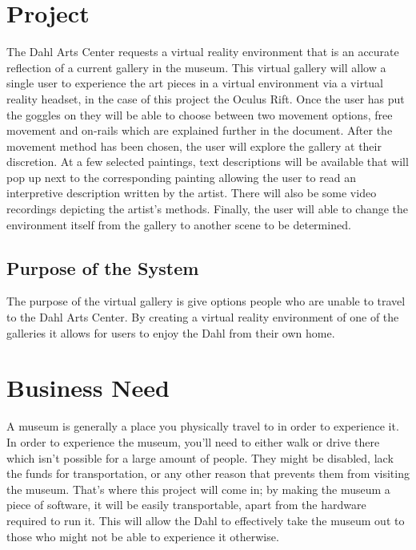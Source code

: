 \section{Project}
The Dahl Arts Center requests a virtual reality environment that is an accurate reflection of a current gallery in the museum.  This virtual gallery will allow a single user to experience the art pieces in a virtual environment via a virtual reality headset, in the case of this project the Oculus Rift.  Once the user has put the goggles on they will be able to choose between two movement options, free movement and on-rails which are explained further in the document.  After the movement method has been chosen, the user will explore the gallery at their discretion.  At a few selected paintings, text descriptions will be available that will pop up next to the corresponding painting allowing the user to read an interpretive description written by the artist.  There will also be some video recordings depicting the artist's methods.  Finally, the user will able to change the environment itself from the gallery to another scene to be determined. 

\subsection{Purpose of the System}
The purpose of the virtual gallery is give options people who are unable to travel to the Dahl Arts Center. By creating a virtual reality environment of one of the galleries it allows for users to enjoy the Dahl from their own home. 


\section{Business Need}
A museum is generally a place you physically travel to in order to experience it.  In order to experience the museum, you'll need to either walk or drive there which isn't possible for a large amount of people.  They might be disabled, lack the funds for transportation, or any other reason that prevents them from visiting the museum.  That's where this project will come in; by making the museum a piece of software, it will be easily transportable, apart from the hardware required to run it.  This will allow the Dahl to effectively take the museum out to those who might not be able to experience it otherwise.

